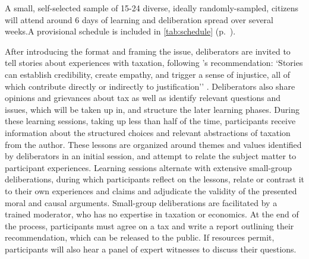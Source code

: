 A small, self-selected sample of 15-24 diverse, ideally randomly-sampled, citizens will attend around 6 days of learning and deliberation spread over several weeks.A provisional schedule is included in \autoref{tab:schedule} (p.~\pageref{tab:schedule}).




After introducing the format and framing the issue, deliberators are invited to tell stories about experiences with taxation, following \citeauthor[67]{Mansbridge2010a}'s recommendation:
`Stories can establish credibility, create empathy, and trigger a sense of injustice, all of which contribute directly or indirectly to justification'' \citeyearpar[67]{Mansbridge2010a}.
Deliberators also share opinions and grievances about tax as well as identify relevant questions and issues, which will be taken up in, and structure the later learning phases.
During these learning sessions, taking up less than half of the time, participants receive information about the structured choices and relevant abstractions of taxation from the author.
These lessons are organized around themes and values identified by deliberators in an initial session, and attempt to relate the subject matter to participant experiences.
Learning sessions alternate with extensive small-group deliberations, during which participants reflect on the lessons, relate or contrast it to their own experiences and claims and adjudicate the validity of the presented moral and causal arguments.
Small-group deliberations are facilitated by a trained moderator, who has no expertise in taxation or economics.
At the end of the process, participants must agree on a tax and write a report outlining their recommendation, which can be released to the public.
If resources permit, participants will also hear a panel of expert witnesses to discuss their questions.



